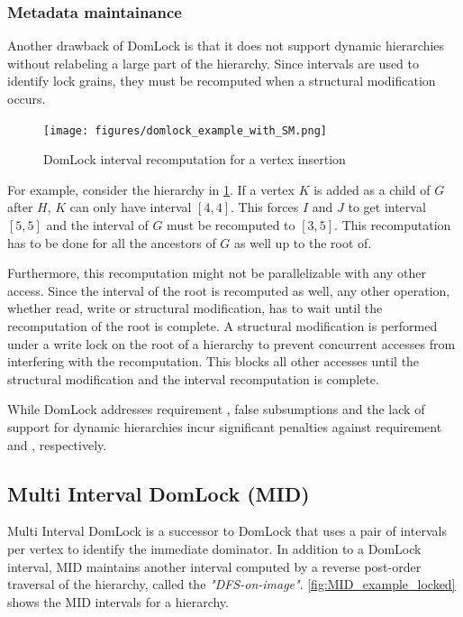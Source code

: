 \subsubsection{Metadata maintainance}

Another drawback of DomLock is that it does not support dynamic hierarchies without relabeling a large part of the hierarchy.
Since intervals are used to identify lock grains, they must be recomputed when a structural modification occurs.

\begin{figure}[h]
    \centering
    \captionsetup{justification=centering}
    \texttt{[image: figures/domlock\_example\_with\_SM.png]}
    \caption{DomLock interval recomputation for a vertex insertion}
    \label{fig:domlock_example_SM}
\end{figure}

For example, consider the hierarchy in \cref{fig:domlock_example_SM}. If a vertex $K$ is added as a child of $G$ after $H$, $K$ can only have interval $[4,4]$. This forces $I$ and $J$ to get interval $[5,5]$ and the interval of $G$ must be recomputed to $[3,5]$. This recomputation has to be done for all the ancestors of $G$ as well up to the root of. 

Furthermore, this recomputation might not be parallelizable with any other access. Since the interval of the root is recomputed as well, any other operation, whether read, write or structural modification, has to wait until the recomputation of the root is complete. 
A structural modification is performed under a write lock on the root of a hierarchy to prevent concurrent accesses from interfering with the recomputation. This blocks all other accesses until the structural modification and the interval recomputation is complete. 


While DomLock addresses requirement \Rb, false subsumptions and the lack of support for dynamic hierarchies incur significant penalties against requirement \Rc and \Rd, respectively.



\subsection{Multi Interval DomLock (MID)}
Multi Interval DomLock \cite{anjuMID} is a successor to DomLock that uses a pair of intervals per vertex to identify the immediate dominator. In addition to a DomLock interval, MID maintains another interval computed by a reverse post-order traversal of the hierarchy, called the \emph{"DFS-on-image"}. \cref{fig:MID_example_locked} shows the MID intervals for a hierarchy. 

